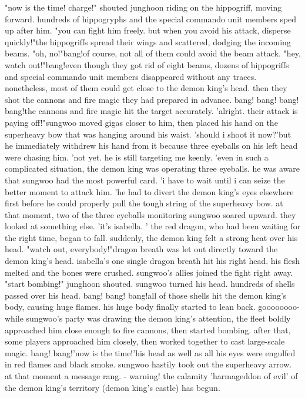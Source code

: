 "now is the time! charge!" shouted junghoon riding on the hippogriff, moving forward.
hundreds of hippogryphs and the special commando unit members sped up after him.
"you can fight him freely.
 but when you avoid his attack, disperse quickly!"the hippogriffs spread their wings and scattered, dodging the incoming beams.
"oh, no!"bang!of course, not all of them could avoid the beam attack.
"hey, watch out!"bang!even though they got rid of eight beams, dozens of hippogriffs and special commando unit members disappeared without any traces.
 nonetheless, most of them could get close to the demon king's head.
 then they shot the cannons and fire magic they had prepared in advance.
bang! bang! bang! bang!the cannons and fire magic hit the target accurately.
'alright.
 their attack is paying off!"sungwoo moved gigas closer to him, then placed his hand on the superheavy bow that was hanging around his waist.
'should i shoot it now?'but he immediately withdrew his hand from it because three eyeballs on his left head were chasing him.
 'not yet.
 he is still targeting me keenly.
'even in such a complicated situation, the demon king was operating three eyeballs.
he was aware that sungwoo had the most powerful card.
'i have to wait until i can seize the better moment to attack him.
'he had to divert the demon king's eyes elsewhere first before he could properly pull the tough string of the superheavy bow.
at that moment, two of the three eyeballs monitoring sungwoo soared upward.
 they looked at something else.
'it's isabella.
'
the red dragon, who had been waiting for the right time, began to fall.
 suddenly, the demon king felt a strong heat over his head.
"watch out, everybody!"dragon breath was let out directly toward the demon king's head.
isabella's one single dragon breath hit his right head.
 his flesh melted and the bones were crushed.
 sungwoo's allies joined the fight right away.
 "start bombing!" junghoon shouted.
 sungwoo turned his head.
 hundreds of shells passed over his head.
bang! bang! bang!all of those shells hit the demon king's body, causing huge flames.
 his huge body finally started to lean back.
goooooooo-while sungwoo's party was drawing the demon king's attention, the fleet boldly approached him close enough to fire cannons, then started bombing.
after that, some players approached him closely, then worked together to cast large-scale magic.
bang! bang!'now is the time!'his head as well as all his eyes were engulfed in red flames and black smoke.
sungwoo hastily took out the superheavy arrow.
at that moment a message rang.
 - warning! the calamity 'harmageddon of evil' of the demon king's territory (demon king's castle) has begun.
